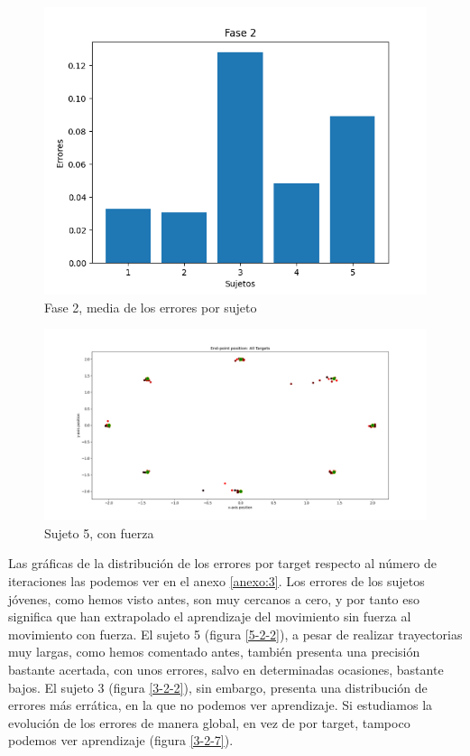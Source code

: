 \documentclass[a4paper,11pt, oneside]{book}
\begin{document}
\begin{figure}[H]
	\includegraphics[width=\linewidth]{fase2-errores}
	\caption{Fase 2, media de los errores por sujeto}
	\label{fase2-errores}
\end{figure}


\begin{figure}[H]
	\includegraphics[width=\linewidth]{sujeto5/force/trayectorias_puntos}
	\caption{Sujeto 5, con fuerza}
	\label{5-2-1}
\end{figure}

Las gráficas de la distribución de los errores por target respecto al número de iteraciones las podemos ver en el anexo \ref{anexo:3}. Los errores de los sujetos jóvenes, como hemos visto antes, son muy cercanos a cero, y por tanto eso significa que han extrapolado el aprendizaje del movimiento sin fuerza al movimiento con fuerza. El sujeto 5 (figura \ref{5-2-2}), a pesar de realizar trayectorias muy largas, como hemos comentado antes, también presenta una precisión bastante acertada, con unos errores, salvo en determinadas ocasiones, bastante bajos. 
El sujeto 3 (figura \ref{3-2-2}), sin embargo, presenta una distribución de  errores más errática, en la que no podemos ver aprendizaje. Si estudiamos la evolución de los errores de manera global, en vez de por target, tampoco podemos ver aprendizaje (figura \ref{3-2-7}).
\end{document}
